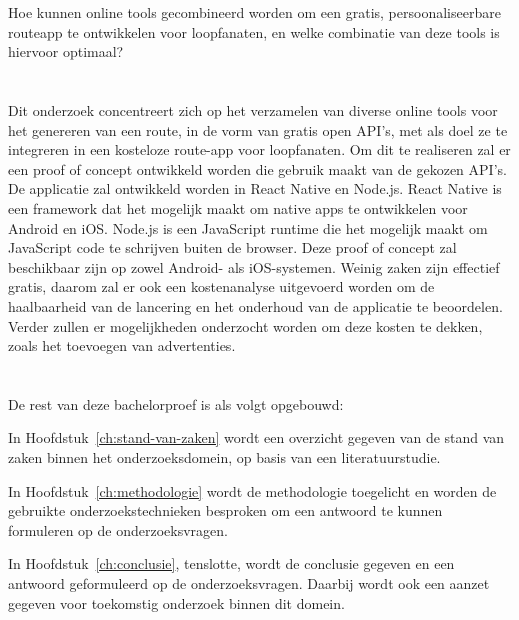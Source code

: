 Hoe kunnen online tools gecombineerd worden om een gratis, persoonaliseerbare routeapp te ontwikkelen voor loopfanaten, en welke combinatie van deze tools is hiervoor optimaal?

\section{}%
\label{sec:onderzoeksdoelstelling}

Dit onderzoek concentreert zich op het verzamelen van diverse online tools voor het genereren van een route, in de vorm van gratis open API's, met als doel ze te integreren in een kosteloze route-app voor loopfanaten.
Om dit te realiseren zal er een proof of concept ontwikkeld worden die gebruik maakt van de gekozen API's. 
De applicatie zal ontwikkeld worden in React Native en Node.js. React Native is een framework dat het mogelijk maakt om native apps te ontwikkelen voor Android en iOS\@. 
Node.js is een JavaScript runtime die het mogelijk maakt om JavaScript code te schrijven buiten de browser.
Deze proof of concept zal beschikbaar zijn op zowel Android- als iOS-systemen. Weinig zaken zijn effectief gratis, 
daarom zal er ook een kostenanalyse uitgevoerd worden om de haalbaarheid van de lancering en het onderhoud van de applicatie te beoordelen.
Verder zullen er mogelijkheden onderzocht worden om deze kosten te dekken, zoals het toevoegen van advertenties.

\section{}%
\label{sec:opzet-bachelorproef}


De rest van deze bachelorproef is als volgt opgebouwd:

In Hoofdstuk~\ref{ch:stand-van-zaken} wordt een overzicht gegeven van de stand van zaken binnen het onderzoeksdomein, op basis van een literatuurstudie.

In Hoofdstuk~\ref{ch:methodologie} wordt de methodologie toegelicht en worden de gebruikte onderzoekstechnieken besproken om een antwoord te kunnen formuleren op de onderzoeksvragen.


In Hoofdstuk~\ref{ch:conclusie}, tenslotte, wordt de conclusie gegeven en een antwoord geformuleerd op de onderzoeksvragen. Daarbij wordt ook een aanzet gegeven voor toekomstig onderzoek binnen dit domein.